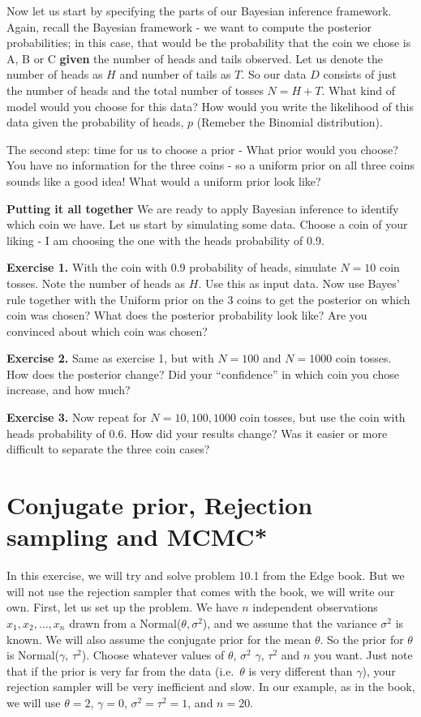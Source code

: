 \documentclass[
]{book}
\begin{document}
Now let us start by specifying the parts of our Bayesian inference framework. Again, recall the Bayesian framework - we want to compute the posterior probabilities; in this case, that would be the probability that the coin we chose is A, B or C \textbf{given} the number of heads and tails observed. Let us denote the number of heads as \(H\) and number of tails as \(T\). So our data \(D\) consists of just the number of heads and the total number of tosses \(N = H+T\). What kind of model would you choose for this data? How would you write the likelihood of this data given the probability of heads, \(p\) (Remeber the Binomial distribution).

The second step: time for us to choose a prior - What prior would you choose? You have no information for the three coins - so a uniform prior on all three coins sounds like a good idea! What would a uniform prior look like?

\textbf{Putting it all together}
We are ready to apply Bayesian inference to identify which coin we have. Let us start by simulating some data. Choose a coin of your liking - I am choosing the one with the heads probability of 0.9.

\textbf{Exercise 1.} With the coin with 0.9 probability of heads, simulate \(N=10\) coin tosses. Note the number of heads as \(H\). Use this as input data. Now use Bayes' rule together with the Uniform prior on the 3 coins to get the posterior on which coin was chosen? What does the posterior probability look like? Are you convinced about which coin was chosen?

\textbf{Exercise 2.} Same as exercise 1, but with \(N=100\) and \(N=1000\) coin tosses. How does the posterior change? Did your ``confidence'' in which coin you chose increase, and how much?

\textbf{Exercise 3.} Now repeat for \(N=10, 100, 1000\) coin tosses, but use the coin with heads probability of 0.6. How did your results change? Was it easier or more difficult to separate the three coin cases?

\hypertarget{conjugate-prior-rejection-sampling-and-mcmc}{%
\section{Conjugate prior, Rejection sampling and MCMC*}\label{conjugate-prior-rejection-sampling-and-mcmc}}

In this exercise, we will try and solve problem 10.1 from the Edge book. But we will not use the rejection sampler that comes with the book, we will write our own. First, let us set up the problem. We have \(n\) independent observations \(x_1, x_2, \dots, x_n\) drawn from a Normal(\(\theta, \sigma^2\)), and we assume that the variance \(\sigma^2\) is known. We will also assume the conjugate prior for the mean \(\theta\). So the prior for \(\theta\) is Normal(\(\gamma\), \(\tau^2\)). Choose whatever values of \(\theta\), \(\sigma^2\) \(\gamma\), \(\tau^2\) and \(n\) you want. Just note that if the prior is very far from the data (i.e.~\(\theta\) is very different than \(\gamma\)), your rejection sampler will be very inefficient and slow. In our example, as in the book, we will use \(\theta = 2\), \(\gamma=0\), \(\sigma^2 = \tau^2 = 1\), and \(n=20\).
\end{document}
